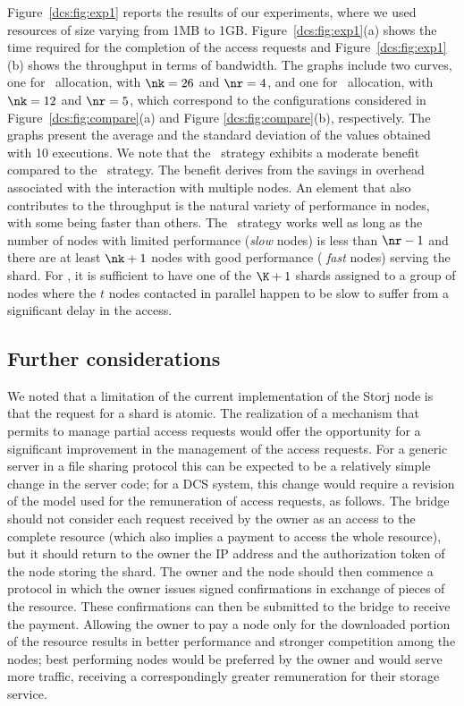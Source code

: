 Figure~\ref{dcs:fig:exp1} reports the results of our experiments, where we
used resources of size varying from 1MB to 1GB.
Figure~\ref{dcs:fig:exp1}(a) shows the time required for the completion of
the access requests and Figure~\ref{dcs:fig:exp1}(b) shows the throughput
in terms of bandwidth. The graphs include two curves, one for
\diagonal\ allocation, with $\nk=26$ and $\nr=4$, and one for
\compact\ allocation, with $\nk=12$ and $\nr=5$, which correspond to
the configurations considered in Figure~\ref{dcs:fig:compare}(a) and
Figure \ref{dcs:fig:compare}(b), respectively.  The graphs present the
average and the standard deviation of the values obtained with 10
executions. We note that the \compact\ strategy exhibits a moderate
benefit compared to the \diagonal\ strategy. The benefit derives from
the savings in overhead associated with the interaction with multiple
nodes. An element that also contributes to the throughput is the
natural variety of performance in nodes, with some being faster than
others.  The \compact\ strategy works well as long as the number of
nodes with limited performance ({\em slow} nodes) is less than $\nr
-1$ and there are at least $\nk +1$ nodes with good performance ({\em
  fast} nodes) serving the shard. For \diagonal, it is sufficient to
have one of the $\K+1$ shards assigned to a group of nodes where the
$t$ nodes contacted in parallel happen to be slow to suffer from a
significant delay in the access.


\subsection{Further considerations \label{dcs:ss:further}}
 We noted that a limitation of the current implementation of the Storj
 node is that the request for a shard is atomic. The realization of a
 mechanism that permits to manage partial access requests would offer
 the opportunity for a significant improvement in the management of
 the access requests. For a generic server in a file sharing protocol
 this can be expected to be a relatively simple change in the server
 code; for a DCS system, this change would require a revision of the
 model used for the remuneration of access requests, as follows.  The
 bridge should not consider each request received by the owner as an
 access to the complete resource (which also implies a payment to
 access the whole resource), but it should return to the owner the IP
 address and the authorization token of the node storing the
 shard. The owner and the node should then commence a protocol in
 which the owner issues signed confirmations in exchange of pieces of
 the resource. These confirmations can then be submitted to the bridge
 to receive the payment.  Allowing the owner to pay a node only for
 the downloaded portion of the resource results in better performance
 and stronger competition among the nodes; best performing nodes would
 be preferred by the owner and would serve more traffic, receiving a
 correspondingly greater remuneration for their storage service.
 
